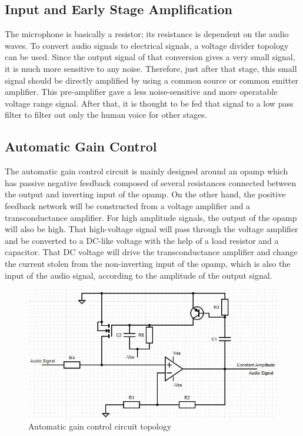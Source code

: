\documentclass[a4paper,10pt]{IEEEtran}
\begin{document}
\subsection{Input and Early Stage Amplification}
The microphone is basically a resistor; its resistance is dependent on the audio waves. To convert audio signals to electrical signals, a voltage divider topology can be used. Since the output signal of that conversion gives a very small signal, it is much more sensitive to any noise. Therefore, just after that stage, this small signal should be directly amplified by using a common source or common emitter amplifier. This pre-amplifier gave a less noise-sensitive and more operatable voltage range signal. After that, it is thought to be fed that signal to a low pass filter to filter out only the human voice for other stages. 
\vspace{-0.5cm}
\subsection{Automatic Gain Control}

The automatic gain control circuit is mainly designed around an opamp which has passive negative feedback composed of several resistances connected between the output and inverting input of the opamp. On the other hand, the positive feedback network will be constructed from a voltage amplifier and a transconductance amplifier. For high amplitude signals, the output of the opamp will also be high. That high-voltage signal will pass through the voltage amplifier and be converted to a DC-like voltage with the help of a load resistor and a capacitor. That DC voltage will drive the transconductance amplifier and change the current stolen from the non-inverting input of the opamp, which is also the input of the audio signal, according to the amplitude of the output signal. 
\vspace{-0.3cm}
\begin{figure}[htbp!]
    \centering
    \includegraphics[width = 1\linewidth]{AGC.jpeg}
    \caption{Automatic gain control circuit topology}
    \label{AGC}
\end{figure} 
\end{document}
